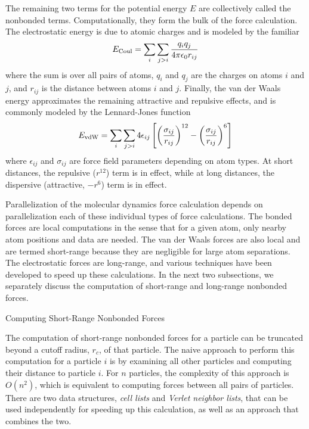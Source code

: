 The remaining two terms for the potential energy $E$
are collectively called the nonbonded terms.
Computationally, they form the bulk of the force calculation.
The electrostatic energy is due to atomic charges and is modeled
by the familiar
\[
E_{\rm Coul} = \sum_{i} \sum_{j>i} \frac{q_i q_j}{4 \pi \epsilon_0 r_{ij}}
\]
where the sum is over all pairs of atoms, $q_i$ and $q_j$ are the
charges on atoms $i$ and $j$, and $r_{ij}$ is the distance
between atoms $i$ and $j$.  Finally, the van der Waals energy
approximates the remaining attractive and repulsive effects, and is commonly
modeled by the Lennard-Jones function
\[
E_{\rm vdW} = \sum_{i} \sum_{j>i} 4 \epsilon_{ij} \left[ 
   \left( \frac{\sigma_{ij}}{r_{ij}} \right)^{12} -
   \left( \frac{\sigma_{ij}}{r_{ij}} \right)^{6} \right]
\]
where $\epsilon_{ij}$ and $\sigma_{ij}$ are force field parameters depending
on atom types.  At short distances, the repulsive ($r^{12}$) term is in 
effect, while at long distances, the dispersive (attractive, $-r^6$) term is in 
effect.

Parallelization of the molecular dynamics force calculation depends on
parallelization each of these individual types of force calculations.
The bonded forces are local computations in the sense that for a given
atom, only nearby atom positions and data are needed.  The van
der Waals forces are also local and are termed short-range because they
are negligible for large atom separations.  The electrostatic forces
are long-range, and various techniques have been developed to speed up
these calculations.  In the next two subsections, we separately discuss the
computation of short-range and long-range nonbonded forces.

 {Computing Short-Range Nonbonded Forces}

The computation of short-range nonbonded forces for a particle can be
truncated beyond a cutoff radius, $r_c$, of that particle.  The naive
approach to perform this computation for a particle $i$ is by examining
all other particles and computing their distance to particle $i$.
For $n$ particles, the complexity of this approach is $O(n^2)$, which is
equivalent to computing forces between all pairs of particles.  There are
two data structures, {\em cell lists} and {\em Verlet neighbor lists},
that can be used independently for speeding up this calculation, as well
as an approach that combines the two.

